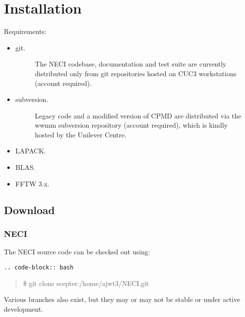 \documentclass[openany,a4paper,10pt,english]{manual}
\begin{document}
\hypertarget{installation}{}\chapter{Installation}

Requirements:
\begin{itemize}
\item {} \begin{description}
\item[git.] \leavevmode
The NECI codebase, documentation and test suite are currently distributed
only from git repositories hosted on CUC3 workstations (account required).

\end{description}

\item {} \begin{description}
\item[subversion.] \leavevmode
Legacy code and a modified version of CPMD are distributed via the wwmm
subversion repository (account required), which is kindly hosted by the
Unilever Centre.

\end{description}

\item {} 
LAPACK.

\item {} 
BLAS.

\item {} 
FFTW 3.x.

\end{itemize}


\section{Download}


\subsection{NECI}

The NECI source code can be checked out using:

\begin{Verbatim}[commandchars=@\[\]]
.. code-block:: bash
\end{Verbatim}
\begin{quote}

\$ git clone scepter:/home/ajwt3/NECI.git
\end{quote}

Various branches also exist, but they may or may not be stable or under
active development.
\end{document}

